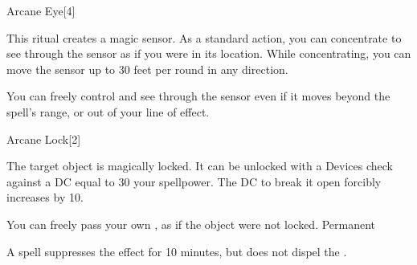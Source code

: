\begin{spellsection}{Arcane Eye}[4]
    \begin{spellheader}
    \end{spellheader}
    \begin{spellcontent}
        \begin{spelltargetinginfo}
            \spellrng{\rngmed}
        \end{spelltargetinginfo}
        \begin{spelleffects}

            \spellline
            \spelleffect This ritual creates a magic sensor. As a standard action, you can concentrate to see through the sensor as if you were in its location. While concentrating, you can move the sensor up to 30 feet per round in any direction.

            You can freely control and see through the sensor even if it moves beyond the spell's range, or out of your line of effect.
            \spelldur \durlong \dismissable
        \end{spelleffects}
    \end{spellcontent}
    \begin{spellfooter}
        \spellnotes {}
    \end{spellfooter}
\end{spellsection}

\begin{spellsection}{Arcane Lock}[2]
    \begin{spellheader}
    \end{spellheader}
    \begin{spellcontent}
        \begin{spelltargetinginfo}
        \end{spelltargetinginfo}
        \begin{spelleffects}

            \spelleffect The target object is magically locked. It can be unlocked with a Devices check against a DC equal to 30 \add your spellpower. The DC to break it open forcibly increases by 10.

            You can freely pass your own , as if the object were not locked.
            \spelldur Permanent
        \end{spelleffects}
    \end{spellcontent}
    \begin{spellfooter}
        \spellnotes A  spell suppresses the effect for 10 minutes, but does not dispel the .
    \end{spellfooter}
\end{spellsection}

